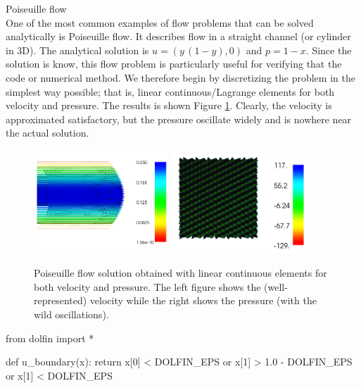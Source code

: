 \begin{example}{Poiseuille flow} \\
One of the most common examples of flow problems that can be solved
analytically is Poiseuille flow. It describes flow in a straight
channel (or cylinder in 3D).  The analytical solution is $u=(y\,
(1-y), 0)$ and $p = 1-x$.  Since the solution is know, this flow
problem is particularly useful for verifying that the code or
numerical method. We therefore begin by discretizing the problem in
the simplest way possible; that is, linear continuous/Lagrange elements
for both velocity and pressure. The results is shown Figure
\ref{fig:stokes1}. Clearly, the velocity is approximated satisfactory,
but the pressure oscillate widely and is nowhere near the actual
solution.
\begin{figure}
\begin{center}
\includegraphics[width=0.45\textwidth]{chapters/Stokes_problem/plots/stokes_velocity.png}
\includegraphics[width=0.45\textwidth]{chapters/Stokes_problem/plots/stokes_pressure_instabilities.png}
\caption{Poiseuille flow solution obtained with linear continuous elements for
both velocity and pressure. The left figure shows the (well-represented) velocity while the right shows
the pressure (with the wild oscillations).}
\label{fig:stokes1}
\end{center}
\end{figure}

\begin{python}
from dolfin import *

def u_boundary(x):
  return x[0] < DOLFIN_EPS or x[1] > 1.0 - DOLFIN_EPS or x[1] < DOLFIN_EPS


\end{python}
\end{example}
